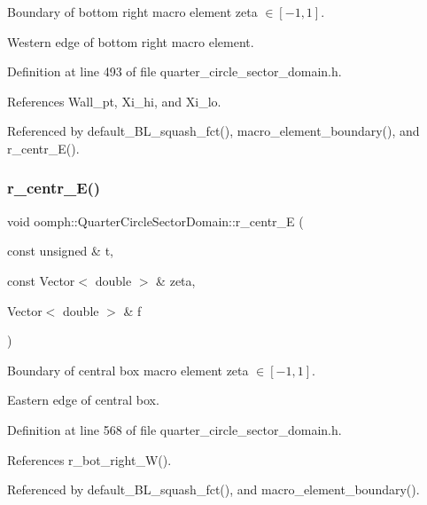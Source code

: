 Boundary of bottom right macro element zeta $ \in [-1,1] $. 

Western edge of bottom right macro element. 

Definition at line 493 of file quarter\+\_\+circle\+\_\+sector\+\_\+domain.\+h.



References Wall\+\_\+pt, Xi\+\_\+hi, and Xi\+\_\+lo.



Referenced by default\+\_\+\+B\+L\+\_\+squash\+\_\+fct(), macro\+\_\+element\+\_\+boundary(), and r\+\_\+centr\+\_\+\+E().

\mbox{\label{classoomph_1_1QuarterCircleSectorDomain_ae4558d37a4f9bb3f9d78b6878cb77a49}} 
\subsubsection{\texorpdfstring{r\+\_\+centr\+\_\+\+E()}{r\_centr\_E()}}
{\footnotesize\ttfamily void oomph\+::\+Quarter\+Circle\+Sector\+Domain\+::r\+\_\+centr\+\_\+E (\begin{DoxyParamCaption}\item[{const unsigned \&}]{t,  }\item[{const Vector$<$ double $>$ \&}]{zeta,  }\item[{Vector$<$ double $>$ \&}]{f }\end{DoxyParamCaption})\hspace{0.3cm}{\ttfamily [private]}}



Boundary of central box macro element zeta $ \in [-1,1] $. 

Eastern edge of central box. 

Definition at line 568 of file quarter\+\_\+circle\+\_\+sector\+\_\+domain.\+h.



References r\+\_\+bot\+\_\+right\+\_\+\+W().



Referenced by default\+\_\+\+B\+L\+\_\+squash\+\_\+fct(), and macro\+\_\+element\+\_\+boundary().

\mbox{\label{classoomph_1_1QuarterCircleSectorDomain_a1cb12e9b1d2e17f8bd5c3d6691be3b1d}} 
